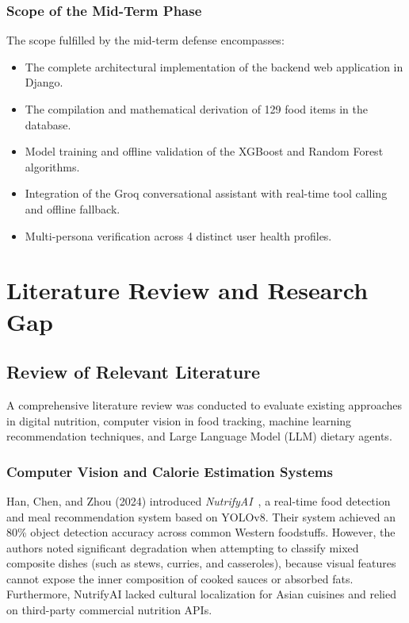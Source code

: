 \documentclass[12pt,a4paper]{report}
\begin{document}
\subsection{Scope of the Mid-Term Phase}
The scope fulfilled by the mid-term defense encompasses:
\begin{itemize}
  \item The complete architectural implementation of the backend web application in Django.
  \item The compilation and mathematical derivation of 129 food items in the database.
  \item Model training and offline validation of the XGBoost and Random Forest algorithms.
  \item Integration of the Groq conversational assistant with real-time tool calling and offline fallback.
  \item Multi-persona verification across 4 distinct user health profiles.
\end{itemize}

\chapter{Literature Review and Research Gap}

\section{Review of Relevant Literature}

A comprehensive literature review was conducted to evaluate existing approaches in digital nutrition, computer vision in food tracking, machine learning recommendation techniques, and Large Language Model (LLM) dietary agents.

\subsection{Computer Vision and Calorie Estimation Systems}
Han, Chen, and Zhou (2024) introduced \textit{NutrifyAI}~\cite{han2024}, a real-time food detection and meal recommendation system based on YOLOv8. Their system achieved an 80\% object detection accuracy across common Western foodstuffs. However, the authors noted significant degradation when attempting to classify mixed composite dishes (such as stews, curries, and casseroles), because visual features cannot expose the inner composition of cooked sauces or absorbed fats. Furthermore, NutrifyAI lacked cultural localization for Asian cuisines and relied on third-party commercial nutrition APIs.
\end{document}
